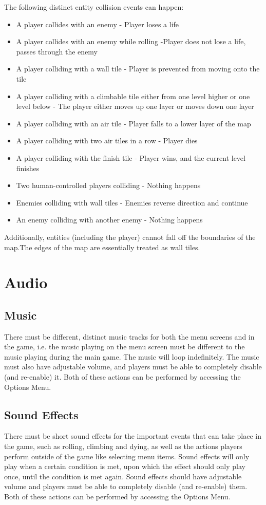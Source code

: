 \documentclass{scrreprt}
\begin{document}
The following distinct entity collision events can happen:
\begin{itemize}
\item A player collides with an enemy - Player loses a life
\item A player collides with an enemy while rolling -Player does not lose a life, passes through the enemy
\item A player colliding with a wall tile - Player is prevented from moving onto the tile
\item A player colliding with a climbable tile either from one level higher or one level below - The player either moves up one layer or moves down one layer
\item A player colliding with an air tile - Player falls to a lower layer of the map
\item A player colliding with two air tiles in a row - Player dies
\item A player colliding with the finish tile - Player wins, and the current level finishes
\item Two human-controlled players colliding - Nothing happens
\item Enemies colliding with wall tiles - Enemies reverse direction and continue
\item An enemy colliding with another enemy - Nothing happens
\end{itemize}

Additionally, entities (including the player) cannot fall off the boundaries of the map.The edges of the map are essentially treated as wall tiles.
\chapter{Audio}

\section{Music}
There must be different, distinct music tracks for both the menu screens and in the game, i.e. the music playing on the menu screen must be different to the music playing during the main game. The music will loop indefinitely. The music must also have adjustable volume, and players must be able to completely disable (and re-enable) it. Both of these actions can be performed by accessing the Options Menu.

\section{Sound Effects}
There must be short sound effects for the important events that can take place in the game, such as rolling, climbing and dying, as well as the actions players perform outside of the game like selecting menu items. Sound effects will only play when a certain condition is met, upon which the effect should only play once, until the condition is met again. Sound effects should have adjustable volume and players must be able to completely disable (and re-enable) them. Both of these actions can be performed by accessing the Options Menu.
\end{document}
